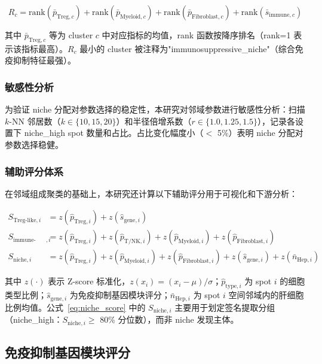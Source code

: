 \documentclass[12pt, a4paper]{ctexart}
\begin{document}
\begin{equation}
R_c = \text{rank}(\bar{p}_{\text{Treg},c}) + \text{rank}(\bar{p}_{\text{Myeloid},c}) + \text{rank}(\bar{p}_{\text{Fibroblast},c}) + \text{rank}(\bar{s}_{\text{immune},c})
\end{equation}

其中 $\bar{p}_{\text{Treg},c}$ 等为 cluster $c$ 中对应指标的均值，rank 函数按降序排名（rank=1 表示该指标最高）。$R_c$ 最小的 cluster 被注释为"immunosuppressive\_niche"（综合免疫抑制特征最强）。

\subsubsection{敏感性分析}

为验证 niche 分配对参数选择的稳定性，本研究对邻域参数进行敏感性分析：扫描 $k$-NN 邻居数（$k \in \{10, 15, 20\}$）和半径倍增系数（$r \in \{1.0, 1.25, 1.5\}$），记录各设置下 niche\_high spot 数量和占比。占比变化幅度小（$<$ 5\%）表明 niche 分配对参数选择稳健。

\subsubsection{辅助评分体系}

在邻域组成聚类的基础上，本研究还计算以下辅助评分用于可视化和下游分析：

\begin{align}
S_{\text{Treg-like},i} &= z(\hat{p}_{\text{Treg},i}) + z(\hat{s}_{\text{gene},i}) \label{eq:treg_score} \\[4pt]
S_{\text{immune-stroma},i} &= z(\hat{p}_{\text{Treg},i}) + z(\hat{p}_{\text{T/NK},i}) + z(\hat{p}_{\text{Myeloid},i}) + z(\hat{p}_{\text{Fibroblast},i}) \label{eq:immune_score} \\[4pt]
S_{\text{niche},i} &= z(\hat{p}_{\text{Treg},i}) + z(\hat{p}_{\text{Myeloid},i}) + z(\hat{p}_{\text{Fibroblast},i}) + z(\hat{s}_{\text{gene},i}) + z(\bar{n}_{\text{Hep},i}) \label{eq:niche_score}
\end{align}

其中 $z(\cdot)$ 表示 Z-score 标准化，$z(x_i) = (x_i - \mu) / \sigma$；$\hat{p}_{\text{type},i}$ 为 spot $i$ 的细胞类型比例；$\hat{s}_{\text{gene},i}$ 为免疫抑制基因模块评分；$\bar{n}_{\text{Hep},i}$ 为 spot $i$ 空间邻域内的肝细胞比例均值。公式~\eqref{eq:niche_score} 中的 $S_{\text{niche},i}$ 主要用于划定签名提取分组（niche\_high：$S_{\text{niche},i} \geq $ 80\% 分位数），而非 niche 发现主体。

\subsection{免疫抑制基因模块评分}
\end{document}
